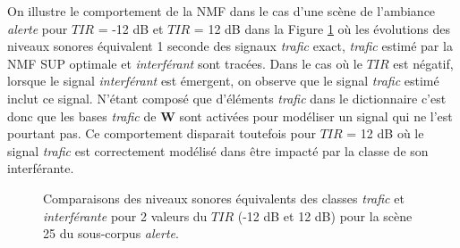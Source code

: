 On illustre le comportement de la NMF dans le cas d'une scène de l'ambiance \textit{alerte} pour $TIR$ = -12 dB et $TIR$ = 12 dB dans la Figure \ref{fig:Lp_alert} où les évolutions des niveaux sonores équivalent 1 seconde des signaux \textit{trafic} exact, \textit{trafic} estimé par la NMF SUP optimale et \textit{interférant} sont tracées. Dans le cas où le $TIR$ est négatif, lorsque le signal \textit{interférant} est émergent, on observe que le signal \textit{trafic} estimé inclut ce signal. N'étant composé que d'éléments \textit{trafic} dans le dictionnaire c'est donc que les bases \textit{trafic} de $\mathbf{W}$ sont activées pour modéliser un signal qui ne l'est pourtant pas. Ce comportement disparait toutefois pour $TIR$ = 12 dB où le signal \textit{trafic} est correctement modélisé dans être impacté par la classe de son interférante.

\begin{figure}[h!]%
\centering
{}%
\qquad
{}%
\caption{Comparaisons des niveaux sonores équivalents des classes \textit{trafic} et \textit{interférante} pour 2 valeurs du $TIR$ (-12 dB et 12 dB) pour la scène 25 du sous-corpus \textit{alerte}.}
\label{fig:Lp_alert}
\end{figure}


